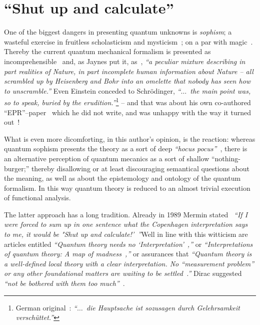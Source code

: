 %
%
%



\chapter{``Shut up and calculate''}

One of the biggest dangers in presenting quantum unknowns is {\em sophism};
a wasteful exercise in fruitless scholasticism
and mysticism~\cite{zeil-05_nature_ofQuantum}; on a par with magic~\cite[p.~631]{zeil-99}.
Thereby the current quantum mechanical formalism is presented as incomprehensible~\cite[p.~129]{feynman-law} and, as Jaynes put it, as~\cite{jaynes-90},
{\em ``a peculiar mixture describing
in part realities of Nature, in part incomplete human information about Nature -- all scrambled up
by Heisenberg and Bohr into an omelette that nobody has seen how to unscramble.''}
Even Einstein conceded to Schr\"odinger,
{\em ``$\ldots$~the main point was, so to speak, buried by the erudition.''}\footnote{
German original~\cite[p.~537]{Meyenn-2011}: {\em ``$\ldots$~die Hauptsache ist sozusagen durch Gelehrsamkeit versch\"uttet.''}
}
-- and that was about his own co-authored ``EPR''--paper~\cite{epr}
which he did not write, and was
unhappy with the way it turned out~\cite[p.~175]{Howard1985171}!

What is even more dicomforting, in this author's opinion, is the reaction:
whereas quantum sophism presents the theory as a sort of deep {\it ``hocus pocus''}~\cite{svozil-2016-quantum-hokus-pokus},
there is an alternative perception of quantum mecanics as a  sort of shallow ``nothing-burger;''
thereby disallowing or at least discouraging
semantical questions about the meaning, as well as about the epistemology and ontology  of the quantum formalism.
In this way quantum theory is reduced to
an almost trivial execution of functional analysis.

The latter approach has a long tradition.
Already in 1989 Mermin stated~\cite{mermin-1989-shutup,mermin-2004-shutup}
{\em ``If I were forced to sum up in one
sentence what the Copenhagen interpretation
says to me, it would be
"Shut up and calculate!'~''}Well in line with this witticism are articles entitled
{\em ``Quantum theory needs no `Interpretation'~\cite{fuchs-peres},''}
or
{\em ``Interpretations of quantum theory: A map of madness~\cite{Cabello-2015-madness},''}
or assurances that {\em ``Quantum theory is a well-defined local theory with a clear interpretation.
No ``measurement problem'' or any other foundational matters are waiting to be settled~\cite{Englert2013}.''}
Dirac  suggested
{\em ``not be bothered with them too much''}~\cite{dirac-noworries}.

